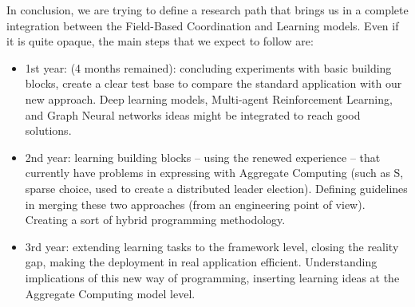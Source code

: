 \documentclass[conference]{IEEEtran}
\begin{document}
In conclusion, we are trying to define a research path that brings us in a complete integration between the Field-Based Coordination and Learning models. Even if it is quite opaque, the main
steps that we expect to follow are:
\begin{itemize}
    \item 1st year: (4 months remained): concluding experiments with basic building blocks, create a clear test base to compare the standard application with our new approach. Deep learning models, Multi-agent Reinforcement Learning, and Graph Neural networks ideas might be integrated to reach good solutions.
    \item 2nd year: learning building blocks -- using the renewed experience -- that currently have problems in expressing with Aggregate Computing (such as S, sparse choice, used to create a distributed leader election).
    Defining guidelines in merging these two approaches (from an engineering point of view). Creating a sort of hybrid programming methodology.
    \item 3rd year: extending learning tasks to the framework level, closing the reality gap, making the deployment in real application efficient. Understanding implications of this new way of programming, inserting learning ideas at the Aggregate Computing model level. 
\end{itemize}



\end{document}
